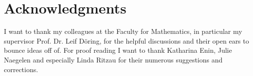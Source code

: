 
\chapter*{Acknowledgments}
    
I want to thank my colleagues at the Faculty for Mathematics, in particular
my supervisor Prof. Dr. Leif Döring, for the helpful discussions and their open
ears to bounce ideas off of.
For proof reading I want to thank Katharina Enin, Julie Naegelen and especially
Linda Ritzau for their numerous suggestions and corrections.


\endinput